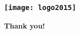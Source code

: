 \documentclass[12pt,svgnames,table]{beamer}
\begin{document}
\begin{frame}
        \frametitle{\hspace{0.3cm} \texttt{[image: logo2015]} }
	\vspace{-0.2cm}
		
	{\tiny        
		
	}
	\vspace{0.2cm}
	\hspace{5cm} {\huge \textbf{Thank you!} }
\end{frame}


\end{document}
